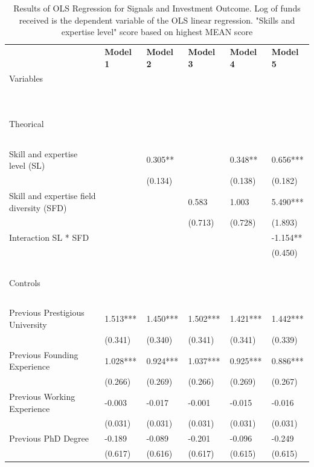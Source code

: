 \documentclass[12pt]{article}
\begin{document}
\begin{table}[!ht]
\scriptsize
    \centering
    \caption{Results of OLS Regression for Signals and Investment Outcome. Log of funds received is the dependent variable of the OLS linear regression. "Skills and expertise level" score based on highest MEAN score}
    \begin{tabular}{llllll}
      \toprule
        ~ & \textbf{Model 1} & \textbf{Model 2} & \textbf{Model 3} & \textbf{Model 4} & \textbf{Model 5} \\
        Variables & ~ & ~ & ~ & ~ & ~ \\
        ~ & ~ & ~ & ~ & ~ & ~ \\
        \midrule
        ~ & ~ & ~ & ~ & ~ & ~ \\
        Theorical & ~ & ~ & ~ & ~ & ~ \\
        & ~ & ~ & ~ & ~ & ~ \\
        Skill and expertise level (SL) & ~ & 0.305** & ~ & 0.348** & 0.656*** \\
        ~ & ~ & (0.134) & ~ & (0.138) & (0.182) \\
        Skill and expertise field diversity (SFD) & ~ & ~ & 0.583 & 1.003 & 5.490*** \\
        ~ & ~ & ~ & (0.713) & (0.728) & (1.893) \\
        Interaction SL * SFD & ~ & ~ & ~ & ~ & -1.154** \\
        ~ & ~ & ~ & ~ & ~ & (0.450) \\
        ~ & ~ & ~ & ~ & ~ & ~ \\
        Controls & ~ & ~ & ~ & ~ & ~ \\
        & ~ & ~ & ~ & ~ & ~ \\
        Previous Prestigious University & 1.513*** & 1.450*** & 1.502*** & 1.421*** & 1.442*** \\
        ~ & (0.341) & (0.340) & (0.341) & (0.341) & (0.339) \\
        Previous Founding Experience & 1.028*** & 0.924*** & 1.037*** & 0.925*** & 0.886*** \\
        ~ & (0.266) & (0.269) & (0.266) & (0.269) & (0.267) \\
        Previous Working Experience & -0.003 & -0.017 & -0.001 & -0.015 & -0.016 \\
        ~ & (0.031) & (0.031) & (0.031) & (0.031) & (0.031) \\
        Previous PhD Degree & -0.189 & -0.089 & -0.201 & -0.096 & -0.249 \\
        ~ & (0.617) & (0.616) & (0.617) & (0.615) & (0.615) \\

\end{tabular}
\end{table}
\end{document}
